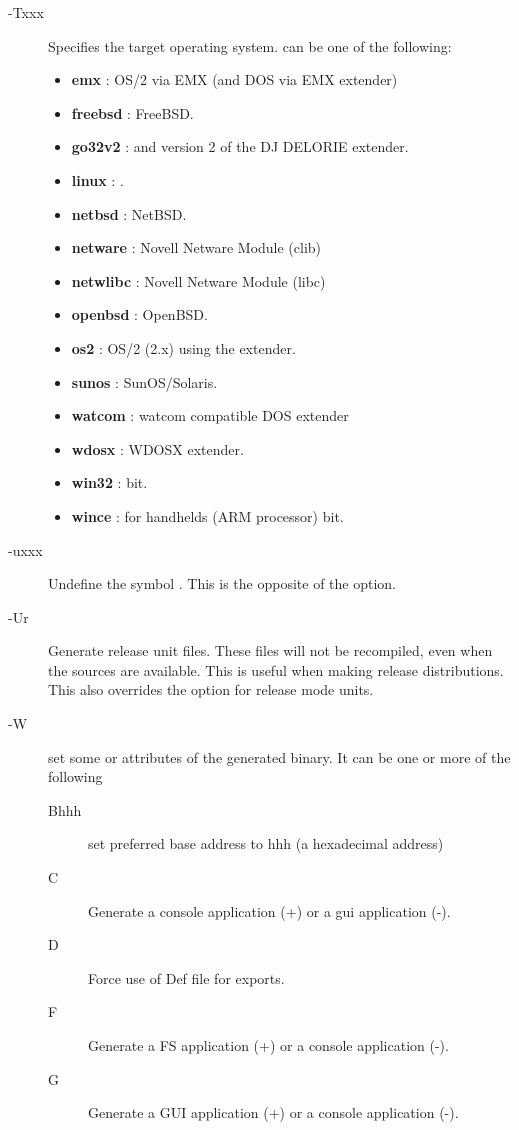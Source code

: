 \begin{description}
\begin{description}
\end{description}
\item[-Txxx]  Specifies the target operating system.  can be one of
the following:
\begin{itemize}
\item \textbf{emx} : OS/2 via EMX (and DOS via EMX extender)
\item \textbf{freebsd} : FreeBSD.
\item \textbf{go32v2} : \dos and version 2 of the DJ DELORIE extender.
\item \textbf{linux} : \linux.
\item \textbf{netbsd} : NetBSD.
\item \textbf{netware} : Novell Netware Module (clib)
\item \textbf{netwlibc} : Novell Netware Module (libc)
\item \textbf{openbsd} : OpenBSD.
\item \textbf{os2} : OS/2 (2.x) using the  extender.
\item \textbf{sunos} : SunOS/Solaris.
\item \textbf{watcom} : watcom compatible DOS extender
\item \textbf{wdosx} : WDOSX extender.
\item \textbf{win32} :  bit.
\item \textbf{wince} : \windows for handhelds (ARM processor) bit.
\end{itemize}
\item [-uxxx]  Undefine the symbol . This is the opposite
of the  option.
\item [-Ur]  Generate release unit files. These files will not be
recompiled, even when the sources are available. This is useful when making
release distributions. This also overrides the  option for release 
mode units.
\item[-W] set some \windows or \ostwo attributes of the generated binary. It
can be one or more of the following
\begin{description}
\item[Bhhh] set preferred base address to hhh (a hexadecimal address)
\item[C] Generate a console application (+) or a gui application (-).
\item[D] Force use of Def file for exports.
\item[F] Generate a FS application (+) or a console application (-).
\item[G] Generate a GUI application (+) or a console application (-).

\end{description}
\end{description}
